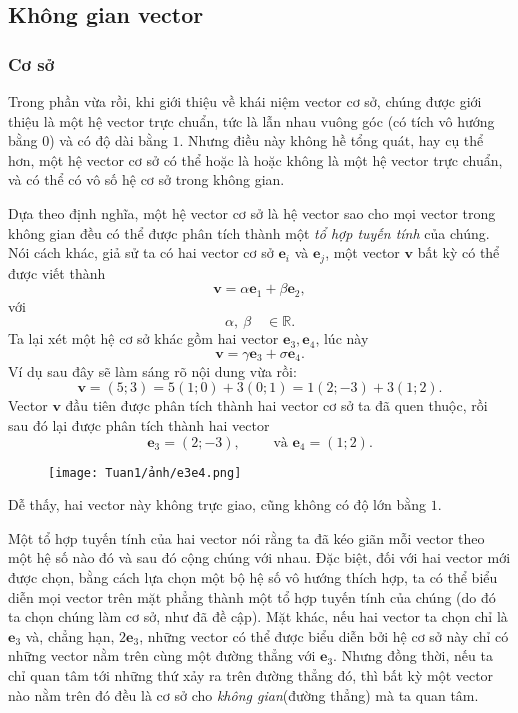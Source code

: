 \subsection{Không gian vector}
\subsubsection*{Cơ sở}
Trong phần vừa rồi, khi giới thiệu về khái niệm vector cơ sở, chúng được giới thiệu là một hệ vector trực chuẩn, tức là lẫn nhau vuông góc (có tích vô hướng bằng \(0\)) và có độ dài bằng \(1\).
Nhưng điều này không hề tổng quát, hay cụ thể hơn, một hệ vector cơ sở có thể hoặc là hoặc không là một hệ vector trực chuẩn, và có thể có vô số hệ cơ sở trong không gian. 
\vspace{5pt}

Dựa theo định nghĩa, một hệ vector cơ sở là hệ vector sao cho mọi vector trong không gian đều có thể được phân tích thành một \emph{tổ hợp tuyến tính} của chúng. Nói cách khác, giả sử ta có hai vector cơ sở \(\mathbf{e}_i\) và \(\mathbf{e}_j\), một vector \(\mathbf{v}\) bất kỳ có thể được viết thành \[\mathbf{v}=\alpha\mathbf{e}_1 +\beta\mathbf{e}_2,\] với \[\alpha,~\beta \quad \in\mathbb{R}.\] Ta lại xét một hệ cơ sở khác gồm hai vector \(\mathbf{e}_{3}, \mathbf{e}_4\), lúc này \[\mathbf{v}=\gamma\mathbf{e}_3 +\sigma\mathbf{e}_4.\]
Ví dụ sau đây sẽ làm sáng rõ nội dung vừa rồi: 
\[\mathbf{v}= (5;3)=5(1;0)+3(0;1)=1(2;-3)
+3(1;2).\] Vector \(\mathbf{v}\) đầu tiên được phân tích thành hai vector cơ sở ta đã quen thuộc, rồi sau đó lại được phân tích thành hai vector \[
\mathbf{e}_3 =(2;-3),\qquad \text{ và } \mathbf{e}_4 =(1;2).\] 
\begin{figure}[H]
    \centering
    \texttt{[image: Tuan1/ảnh/e3e4.png]}
\end{figure}
Dễ thấy, hai vector này không trực giao, cũng không có độ lớn bằng \(1\). 

Một tổ hợp tuyến tính của hai vector nói rằng ta đã kéo giãn mỗi vector theo một hệ số nào đó và sau đó cộng chúng với nhau. Đặc biệt, đối với hai vector mới được chọn, bằng cách lựa chọn một bộ hệ số vô hướng thích hợp, ta có thể biểu diễn mọi vector trên mặt phẳng thành một tổ hợp tuyến tính của chúng (do đó ta chọn chúng làm cơ sở, như đã đề cập). 
Mặt khác, nếu hai vector ta chọn chỉ là \(\mathbf{e}_3\) và, chẳng hạn, \(2\mathbf{e}_3\), những vector có thể được biểu diễn bởi hệ cơ sở này chỉ có những vector nằm trên cùng một đường thẳng với \(\mathbf{e}_3\). Nhưng đồng thời, nếu ta chỉ quan tâm tới 
những thứ xảy ra trên đường thẳng đó, thì bất kỳ một vector nào nằm trên đó đều là cơ sở cho \emph{không gian}(đường thẳng) mà ta quan tâm.
\vspace{8pt}

